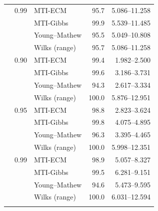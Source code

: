 \begin{longtable}{@{}rrlrr@{}}
\addlinespace[0.3em]
500 & 0.99 & MTI-ECM & 95.7 & 5.086--11.258 \\
 &  & MTI-Gibbs & 99.9 & 5.539--11.485 \\
 &  & Young--Mathew & 95.5 & 5.049--10.808 \\
 &  & Wilks (range) & 95.7 & 5.086--11.258 \\
\addlinespace[0.3em]
1000 & 0.90 & MTI-ECM & 99.4 & 1.982--2.500 \\
 &  & MTI-Gibbs & 99.6 & 3.186--3.731 \\
 &  & Young--Mathew & 94.3 & 2.617--3.334 \\
 &  & Wilks (range) & 100.0 & 5.876--12.951 \\
\addlinespace[0.3em]
1000 & 0.95 & MTI-ECM & 98.8 & 2.823--3.624 \\
 &  & MTI-Gibbs & 99.8 & 4.075--4.895 \\
 &  & Young--Mathew & 96.3 & 3.395--4.465 \\
 &  & Wilks (range) & 100.0 & 5.998--12.351 \\
\addlinespace[0.3em]
1000 & 0.99 & MTI-ECM & 98.9 & 5.057--8.327 \\
 &  & MTI-Gibbs & 99.5 & 6.281--9.151 \\
 &  & Young--Mathew & 94.6 & 5.473--9.595 \\
 &  & Wilks (range) & 100.0 & 6.031--12.594 \\
\addlinespace[0.3em]
\end{longtable}
\clearpage
